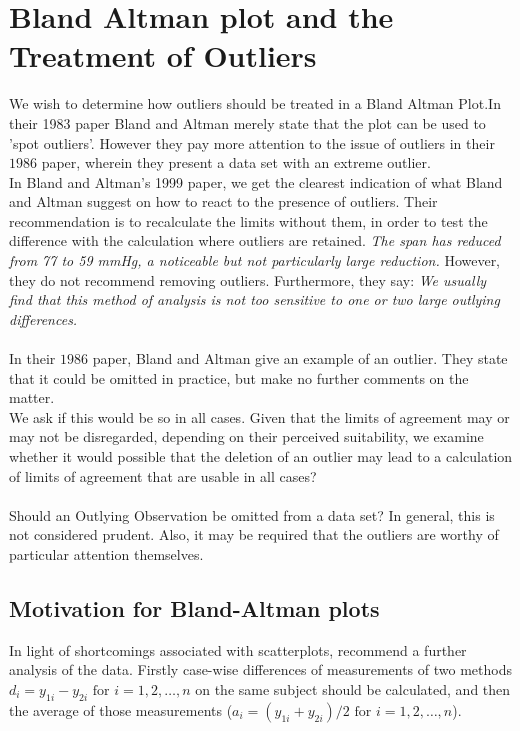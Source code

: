 \documentclass[Chap2main.tex]{subfiles}
\begin{document}
	\section{Bland Altman plot and the Treatment of Outliers}
	We wish to determine how outliers should be treated in a Bland
	Altman Plot.In their 1983 paper Bland and Altman  merely state
	that the plot can be used to 'spot outliers'. However they pay
	more attention to the issue of outliers in their $1986$ paper,
	wherein they present a data set with an extreme outlier.
	\\
	In Bland and Altman's 1999 paper, we get the clearest indication
	of what Bland and Altman suggest on how to react to the presence
	of outliers. Their recommendation is to recalculate the limits
	without them, in order to test the difference with the calculation
	where outliers are retained. \emph{The span has reduced from 77 to
		59 mmHg, a noticeable but not particularly large reduction.}
	However, they do not recommend removing outliers. Furthermore,
	they say: \emph{We usually find that this method of analysis is
		not too sensitive to one or two large outlying differences.}
	\\
	\\
	In  their $1986$ paper, Bland and Altman give an example of an
	outlier. They state that it could be omitted in practice, but make
	no further comments on the matter.
	\\
	We ask if this would be so in all cases. Given that the limits of
	agreement may or may not be disregarded, depending on their
	perceived suitability, we examine whether it would possible that
	the deletion of an outlier may lead to a calculation of limits of
	agreement that are usable in all cases?
	\\
	\\
	Should an Outlying Observation be omitted from a data set? In
	general, this is not considered prudent. Also, it may be required
	that the outliers are worthy of particular attention themselves.
\subsection{Motivation for Bland-Altman plots}

In light of shortcomings associated with scatterplots,
\citet*{BA83} recommend a further analysis of the data. Firstly
case-wise differences of measurements of two methods $d_{i} =
y_{1i}-y_{2i} \mbox{ for }i=1,2,\dots,n$ on the same subject
should be calculated, and then the average of those measurements
($a_{i} = (y_{1i} + y_{2i})/2 \mbox{ for }i=1,2,\dots, n$).
\end{document}
